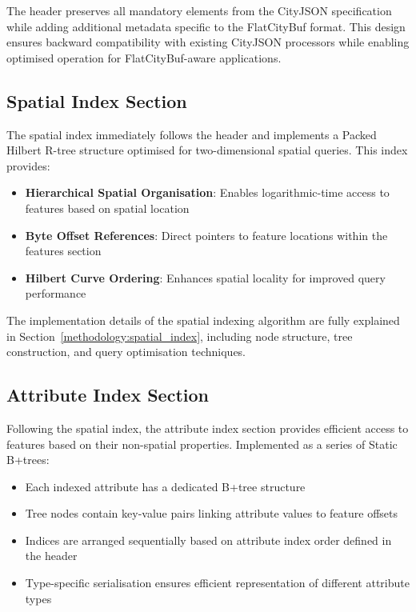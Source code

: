 The header preserves all mandatory elements from the CityJSON specification while adding additional metadata specific to the FlatCityBuf format. This design ensures backward compatibility with existing CityJSON processors while enabling optimised operation for FlatCityBuf-aware applications.

\subsection{Spatial Index Section}
\label{methodology:overview:spatial_index_section}

The spatial index immediately follows the header and implements a Packed Hilbert R-tree structure optimised for two-dimensional spatial queries. This index provides:

\begin{itemize}
  \item \textbf{Hierarchical Spatial Organisation}: Enables logarithmic-time access to features based on spatial location
  \item \textbf{Byte Offset References}: Direct pointers to feature locations within the features section
  \item \textbf{Hilbert Curve Ordering}: Enhances spatial locality for improved query performance
\end{itemize}

The implementation details of the spatial indexing algorithm are fully explained in Section~\ref{methodology:spatial_index}, including node structure, tree construction, and query optimisation techniques.

\subsection{Attribute Index Section}
\label{methodology:overview:attribute_index_section}

Following the spatial index, the attribute index section provides efficient access to features based on their non-spatial properties. Implemented as a series of Static B+trees:

\begin{itemize}
  \item Each indexed attribute has a dedicated B+tree structure
  \item Tree nodes contain key-value pairs linking attribute values to feature offsets
  \item Indices are arranged sequentially based on attribute index order defined in the header
  \item Type-specific serialisation ensures efficient representation of different attribute types
\end{itemize}

